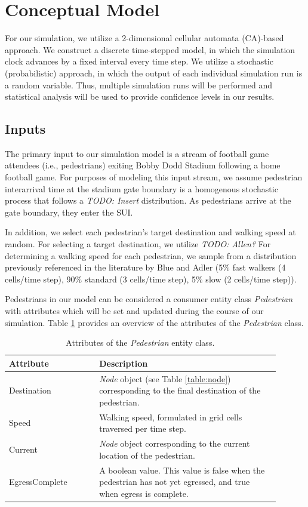 \documentclass[12pt]{article}
\begin{document}
\section{Conceptual Model}
For our simulation, we utilize a 2-dimensional cellular automata (CA)-based
approach. We construct a discrete time-stepped model, in which the simulation
clock advances by a fixed interval every time step. We utilize a stochastic
(probabilistic) approach, in which the output of each individual simulation
run is a random variable. Thus, multiple simulation runs will be performed and
statistical analysis will be used to provide confidence levels in our results.

\subsection{Inputs}
The primary input to our simulation model is a stream of football game attendees
(i.e., pedestrians) exiting Bobby Dodd Stadium following a home football game.
For purposes of modeling this input stream, we assume pedestrian interarrival
time at the stadium gate boundary is a homogenous stochastic process that
follows a \textit{TODO: Insert} distribution. As pedestrians arrive at the gate
boundary, they enter the SUI.

In addition, we select each pedestrian's target destination and walking
speed at random. For selecting a target destination, we utilize \textit{TODO: Allen?}
For determining a walking speed for each pedestrian, we sample from a
distribution previously referenced in the literature by Blue and Adler
\cite{blue2001cellular} (5\% fast walkers (4 cells/time step), 90\% standard
(3 cells/time step), 5\% slow (2 cells/time step)).

Pedestrians in our model can be considered a consumer entity class
\textit{Pedestrian} with attributes which will be set and updated during the
course of our simulation. Table \ref{table:ped} provides an overview of the
attributes of the \textit{Pedestrian} class.

\def\arraystretch{1.5}
\begin{table}[hb!]
  \centering
    \begin{tabular}{p{0.3\linewidth}p{0.6\linewidth}}
     \hline
     Attribute & Description \\
     \hline
     Destination    & \textit{Node} object (see Table \ref{table:node})
                      corresponding to the final destination of the
                      pedestrian. \\
     Speed          & Walking speed, formulated in grid cells traversed per
                      time step. \\
     Current        & \textit{Node} object corresponding to the current
                      location of the pedestrian. \\
     EgressComplete & A boolean value. This value is false when the pedestrian
                      has not yet egressed, and true when egress is complete. \\
     \hline
    \end{tabular}
    \caption{Attributes of the \textit{Pedestrian} entity class.}
  \label{table:ped}
\end{table}
\end{document}
